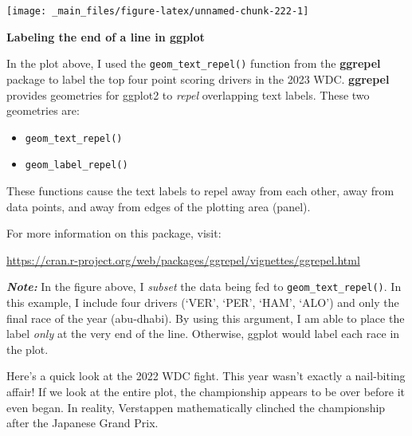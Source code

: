 \documentclass[
]{book}
\providecommand{\tightlist}{%
  \setlength{\itemsep}{0pt}\setlength{\parskip}{0pt}}
\begin{document}
\begin{center}\texttt{[image: \_main\_files/figure-latex/unnamed-chunk-222-1]} \end{center}

\begin{blackbox}

\begin{center}
\textbf{Labeling the end of a line in ggplot}

\end{center}

In the plot above, I used the \texttt{geom\_text\_repel()} function from the \textbf{ggrepel} package to label the top four point scoring drivers in the 2023 WDC. \textbf{ggrepel} provides geometries for ggplot2 to \emph{repel} overlapping text labels. These two geometries are:

\begin{itemize}
\tightlist
\item
  \texttt{geom\_text\_repel()}
\item
  \texttt{geom\_label\_repel()}
\end{itemize}

These functions cause the text labels to repel away from each other, away from data points, and away from edges of the plotting area (panel).

For more information on this package, visit:

\url{https://cran.r-project.org/web/packages/ggrepel/vignettes/ggrepel.html}

\textbf{\emph{Note:}} In the figure above, I \emph{subset} the data being fed to \texttt{geom\_text\_repel()}. In this example, I include four drivers (`VER', `PER', `HAM', `ALO') and only the final race of the year (abu-dhabi). By using this argument, I am able to place the label \emph{only} at the very end of the line. Otherwise, ggplot would label each race in the plot.

\end{blackbox}

Here's a quick look at the 2022 WDC fight. This year wasn't exactly a nail-biting affair! If we look at the entire plot, the championship appears to be over before it even began. In reality, Verstappen mathematically clinched the championship after the Japanese Grand Prix.
\end{document}

